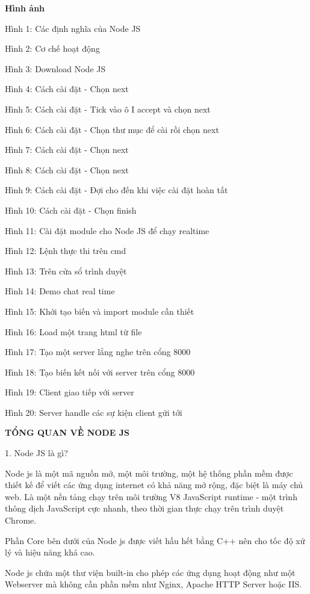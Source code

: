 \documentclass{report}
\begin{document}
\changefontsizes{14pt}
\bigskip
\textbf{Hình ảnh}

\bigskip
\changefontsizes{13pt}
Hình 1: Các định nghĩa của Node JS

Hình 2: Cơ chế hoạt động

Hình 3: Download Node JS

Hình 4: Cách cài đặt - Chọn next

Hình 5: Cách cài đặt - Tick vào ô I accept và chọn next

Hình 6: Cách cài đặt - Chọn thư mục để cài rồi chọn next

Hình 7: Cách cài đặt - Chọn next

Hình 8: Cách cài đặt - Chọn next

Hình 9: Cách cài đặt - Đợi cho đến khi việc cài đặt hoàn tất

Hình 10: Cách cài đặt - Chọn finish

Hình 11: Cài đặt module cho Node JS để chạy realtime

Hình 12: Lệnh thực thi trên cmd

Hình 13: Trên cửa sổ trình duyệt

Hình 14: Demo chat real time

Hình 15: Khởi tạo biến và import module cần thiết

Hình 16: Load một trang html từ file

Hình 17: Tạo một server lắng nghe trên cổng 8000

Hình 18: Tạo biến kết nối với server trên cổng 8000

Hình 19: Client giao tiếp với server

Hình 20: Server handle các sự kiện client gửi tới

\newpage
\changefontsizes{16pt}
\centerline{\textbf{TỔNG QUAN VỀ NODE JS}}

\bigskip
\changefontsizes{14pt}
1. Node JS là gì?

\smallskip
\setlength{\parindent}{1cm}
Node js là một mã nguồn mở, một môi trường, một hệ thống phần mềm được thiết kế để viết các ứng dụng internet có khả năng mở rộng, đặc biệt là máy chủ web. Là một nền tảng chạy trên môi trường V8 JavaScript runtime - một trình thông dịch JavaScript cực nhanh, theo thời gian thực chạy trên trình duyệt Chrome.

Phần Core bên dưới của Node js được viết hầu hết bằng C++ nên cho tốc độ xử lý và hiệu năng khá cao.

Node js chứa một thư viện built-in cho phép các ứng dụng hoạt động như một Webserver mà không cần phần mềm như Nginx, Apache HTTP Server hoặc IIS.
\end{document}

